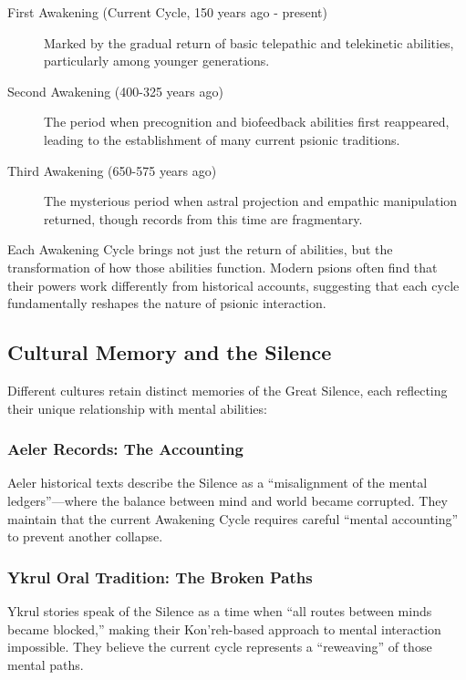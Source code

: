 \documentclass[11pt,twoside]{article}
\begin{document}
\begin{description}
    \item[First Awakening (Current Cycle, 150 years ago - present)] Marked by the gradual return of basic telepathic and telekinetic abilities, particularly among younger generations.
    
    \item[Second Awakening (400-325 years ago)] The period when precognition and biofeedback abilities first reappeared, leading to the establishment of many current psionic traditions.
    
    \item[Third Awakening (650-575 years ago)] The mysterious period when astral projection and empathic manipulation returned, though records from this time are fragmentary.
\end{description}

Each Awakening Cycle brings not just the return of abilities, but the transformation of how those abilities function. Modern psions often find that their powers work differently from historical accounts, suggesting that each cycle fundamentally reshapes the nature of psionic interaction.

\subsection{Cultural Memory and the Silence}

Different cultures retain distinct memories of the Great Silence, each reflecting their unique relationship with mental abilities:

\subsubsection{Aeler Records: The Accounting}
Aeler historical texts describe the Silence as a ``misalignment of the mental ledgers''---where the balance between mind and world became corrupted. They maintain that the current Awakening Cycle requires careful ``mental accounting'' to prevent another collapse.

\subsubsection{Ykrul Oral Tradition: The Broken Paths}
Ykrul stories speak of the Silence as a time when ``all routes between minds became blocked,'' making their Kon'reh-based approach to mental interaction impossible. They believe the current cycle represents a ``reweaving'' of those mental paths.
\end{document}
